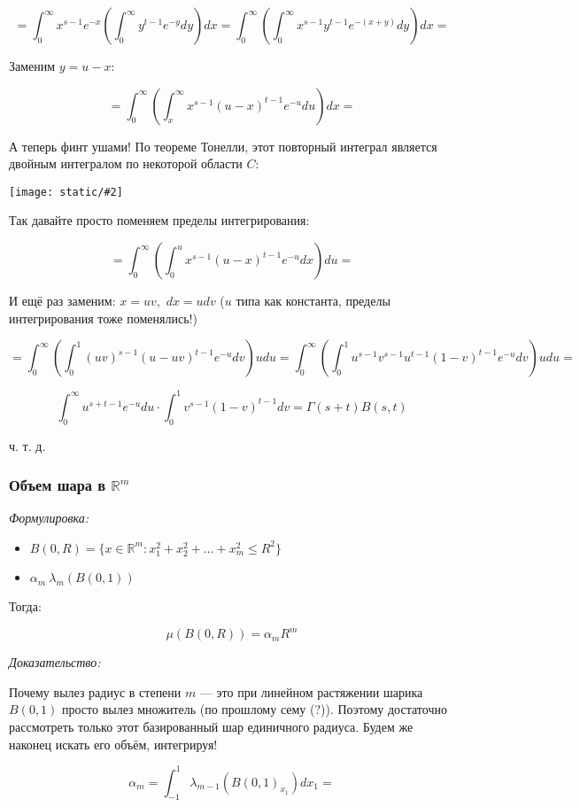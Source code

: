 \documentclass{article}
\def\dbl{\,\,}
\def\images#1#2{\begin{center}\texttt{[image: static/\#2]}\end{center}}
\begin{document}
\[= \int_{0}^{\infty} x^{s - 1}e^{-x} \left(\int_{0}^{\infty} y^{t - 1}e^{-y}dy\right)dx = \int_{0}^{\infty}  \left(\int_{0}^{\infty} x^{s - 1} y^{t - 1}e^{-(x + y)}dy\right)dx = \]

Заменим $y = u - x$:

\[= \int_{0}^{\infty} \left(\int_{x}^{\infty}x^{s - 1}(u - x)^{t - 1}e^{-u}du\right)dx = \]

А теперь финт ушами! По теореме Тонелли, этот повторный интеграл является двойным интегралом по некоторой области $C$:

\images{0.3}{betta.jpg}

Так давайте просто поменяем пределы интегрирования: 

\[= \int_{0}^{\infty} \left(\int_{0}^{u}x^{s - 1}(u - x)^{t - 1}e^{-u}dx\right)du = \]

И ещё раз заменим: $x = uv, \dbl dx = udv$ ($u$ типа как константа, пределы интегрирования тоже поменялись!)

\[= \int_{0}^{\infty} \left(\int_{0}^{1}(uv)^{s - 1}(u - uv)^{t - 1}e^{-u}dv\right)udu = \int_{0}^{\infty} \left(\int_{0}^{1}u^{s - 1}v^{s - 1}u^{t - 1}(1 - v)^{t - 1}e^{-u}dv\right)udu = \]

\[\int_{0}^{\infty}u^{s + t - 1}e^{-u} du \cdot \int_{0}^{1}v^{s - 1}(1 - v)^{t - 1}dv = \Gamma(s + t)B(s, t)\]

ч. т. д.

\subsubsection{Объем шара в $\mathbb{R}^m$}
\textit{Формулировка:}

\begin{itemize}
    \item $B(0, R) = \{x \in \mathbb{R}^{m}: x_1^{2} + x_2^{2} + \ldots + x_m^{2} \le R^{2}\}$
    \item $\alpha_{m} \ \lambda_{m}(B(0, 1))$
\end{itemize}

Тогда: 

\[\mu\left(B(0, R)\right) = \alpha_m R^{m}\]

\textit{Доказательство:}

Почему вылез радиус в степени $m$ --- это при линейном растяжении шарика $B(0, 1)$ просто вылез множитель (по прошлому сему (?)). Поэтому достаточно рассмотреть только этот базированный шар единичного радиуса. Будем же наконец искать его объём, интегрируя!

\[\alpha_m = \int_{-1}^{1} \lambda_{m - 1} \left(B(0, 1)_{x_1}\right) dx_1 = \]
\end{document}
